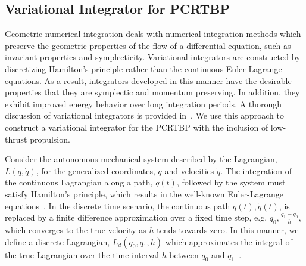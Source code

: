 \documentclass[smallcondensed]{svjour3}
\begin{document}
\subsection{Variational Integrator for PCRTBP}\label{sec:discrete_var}
Geometric numerical integration deals with numerical integration methods which preserve the geometric properties of the flow of a differential equation, such as invariant properties and symplecticity.
Variational integrators are constructed by discretizing Hamilton's principle rather than the continuous Euler-Lagrange equations.
As a result, integrators developed in this manner have the desirable properties that they are symplectic and momentum preserving.
In addition, they exhibit improved energy behavior over long integration periods.
A thorough discussion of variational integrators is provided in~\cite{west2004,marsden2001}.
We use this approach to construct a variational integrator for the PCRTBP with the inclusion of low-thrust propulsion.

Consider the autonomous mechanical system described by the Lagrangian, \( L(q, \dot{q} ) \), for the generalized coordinates, \( q\) and velocities \( \dot{q} \).
The integration of the continuous Lagrangian along a path, \( q (t) \), followed by the system must satisfy Hamilton's principle, which results in the well-known Euler-Lagrange equations~\cite{lanczos1970}.
In the discrete time scenario, the continuous path \( q(t), \dot{q}(t) \), is replaced by a finite difference approximation over a fixed time step, e.g. \( q_0, \frac{q_1 - q_0}{h} \), which converges to the true velocity as \( h \) tends towards zero.
In this manner, we define a discrete Lagrangian, \( L_d (q_0, q_1, h) \) which approximates the integral of the true Lagrangian over the time interval \( h \) between \( q_0 \) and \( q_1\)~\cite{marsden2001}.
\end{document}
